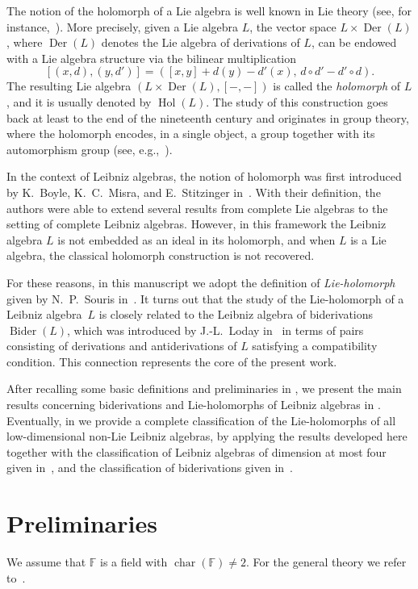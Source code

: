 \documentclass[11pt,a4paper]{amsart}
\theoremstyle{plain}
\theoremstyle{definition}
\theoremstyle{remark}
\numberwithin{equation}{section}
\newcommand{\0}{\emptyset}
\newcommand{\bF}{\mathbb{F}}
\DeclareMathOperator{\bchar}{char}
\DeclareMathOperator{\Der}{Der}
\DeclareMathOperator{\Bider}{Bider}
\DeclareMathOperator{\hol}{Hol}
\begin{document}
The notion of the holomorph of a Lie algebra is well known in Lie theory
(see, for instance,~\cite{jacobsonLie}). More precisely, given a Lie algebra $L$, the vector space $L \times \Der(L)$, where $\Der(L)$ denotes the Lie algebra of derivations of $L$, can be endowed with a Lie algebra structure via the bilinear multiplication
\[
[(x,d),(y,d')]=\left([x,y] + d(y) - d'(x),\,d \circ d' - d' \circ d \right).
\]
The resulting Lie algebra $(L \times \Der(L),[-,-])$ is called the \emph{holomorph}
of $L$, and it is usually denoted by $\hol(L)$. The study of this construction
goes back at least to the end of the nineteenth century and originates in group
theory, where the holomorph encodes, in a single object, a group together with its
automorphism group (see, e.g.,~\cite{Burnside_2012}).

In the context of Leibniz algebras, the notion of holomorph was first introduced by K.~Boyle, K.~C.~Misra, and E.~Stitzinger in~\cite{misra}. With their definition, the authors were able to extend several results from complete Lie algebras to the setting of complete Leibniz algebras. However, in this framework the Leibniz algebra $L$ is not embedded as an ideal in its holomorph, and when $L$ is a Lie algebra, the classical holomorph construction is not recovered.

For these reasons, in this manuscript we adopt the definition of \emph{Lie-holomorph} given by N.~P.~Souris in~\cite{souris}. It turns out that the study of the Lie-holomorph of a Leibniz algebra~$L$ is closely related to the Leibniz algebra of biderivations $\Bider(L)$, which was introduced by J.-L.~Loday in~\cite{loday1993} in terms of pairs consisting of derivations and antiderivations of $L$ satisfying a compatibility condition. This connection represents the core of the present work.

After recalling some basic definitions and preliminaries in , we present the main results concerning biderivations and Lie-holomorphs of Leibniz algebras in . Eventually, in  we provide a complete classification of the Lie-holomorphs of all low-dimensional non-Lie Leibniz algebras, by applying the results developed here together with the classification of Leibniz algebras of dimension at most four given in~\cite{4-dim-nil, 4-dim-Misra, 4-dim-solv}, and the classification of biderivations given in~\cite{ManciniBider}.

\section{Preliminaries}\label{sec:preliminaries}
We assume that $\bF$ is a field with $\bchar(\bF)\neq2$. For the general theory we refer to~\cite{ayupov2019,loday1993}.
\end{document}

